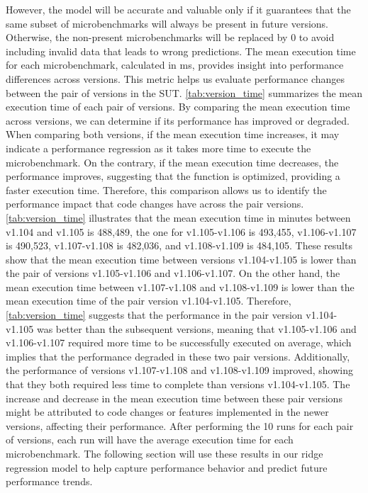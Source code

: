However, the model will be accurate and valuable only if it guarantees that the same subset of microbenchmarks will always be present in future versions. Otherwise, the non-present microbenchmarks will be replaced by 0 to avoid including invalid data that leads to wrong predictions. The mean execution time for each microbenchmark, calculated in \ac{ms}, provides insight into performance differences across versions. This metric helps us evaluate performance changes between the pair of versions in the  \ac{SUT}. \cref{tab:version_time} summarizes the mean execution time of each pair of versions. By comparing the mean execution time across versions, we can determine if its performance has improved or degraded. When comparing both versions, if the mean execution time increases, it may indicate a performance regression as it takes more time to execute the microbenchmark. On the contrary, if the mean execution time decreases, the performance improves, suggesting that the function is optimized, providing a faster execution time. Therefore, this comparison allows us to identify the performance impact that code changes have across the pair versions.  \\
\cref{tab:version_time} illustrates that the mean execution time in minutes between v1.104 and v1.105 is 488,489, the one for v1.105-v1.106 is 493,455, v1.106-v1.107 is 490,523, v1.107-v1.108 is 482,036, and v1.108-v1.109 is 484,105. These results show that the mean execution time between versions v1.104-v1.105 is lower than the pair of versions v1.105-v1.106 and v1.106-v1.107. On the other hand, the mean execution time between v1.107-v1.108 and v1.108-v1.109 is lower than the mean execution time of the pair version v1.104-v1.105. Therefore, \cref{tab:version_time} suggests that the performance in the pair version v1.104-v1.105 was better than the subsequent versions, meaning that v1.105-v1.106 and v1.106-v1.107 required more time to be successfully executed on average, which implies that the performance degraded in these two pair versions. Additionally, the performance of versions v1.107-v1.108 and v1.108-v1.109 improved, showing that they both required less time to complete than versions v1.104-v1.105. The increase and decrease in the mean execution time between these pair versions might be attributed to code changes or features implemented in the newer versions, affecting their performance. After performing the 10 runs for each pair of versions, each run will have the average execution time for each microbenchmark. The following section will use these results in our ridge regression model to help capture performance behavior and predict future performance trends.  

